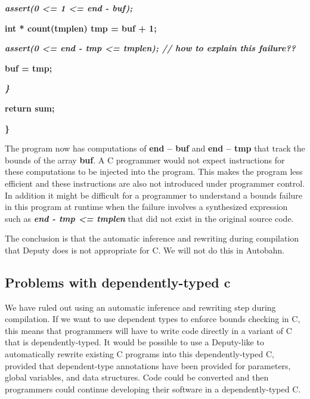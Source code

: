 \documentclass[]{article}
\begin{document}
\emph{\textbf{assert(0 \textless{}= 1 \textless{}= end - buf);}}

\textbf{int * count(tmplen) tmp = buf + 1;}

\emph{\textbf{assert(0 \textless{}= end - tmp \textless{}= tmplen); //
how to explain this failure??}}

\textbf{buf = tmp;}

\emph{\textbf{\}}}

\textbf{return sum;}

\textbf{\}}

The program now has computations of \textbf{end -- buf} and \textbf{end
-- tmp} that track the bounds of the array \textbf{buf}. A C programmer
would not expect instructions for these computations to be injected into
the program. This makes the program less efficient and these
instructions are also not introduced under programmer control. In
addition it might be difficult for a programmer to understand a bounds
failure in this program at runtime when the failure involves a
synthesized expression such as \emph{\textbf{end - tmp \textless{}=
tmplen}} that did not exist in the original source code.

The conclusion is that the automatic inference and rewriting during
compilation that Deputy does is not appropriate for C. We will not do
this in Autobahn.

\subsection{\texorpdfstring{\protect\hypertarget{ux5fToc420589169}{}{\protect\hypertarget{ux5fToc422906950}{}{\protect\hypertarget{ux5fToc424307673}{}{\protect\hypertarget{ux5fToc426641129}{}{\protect\hypertarget{ux5fToc435435004}{}{\protect\hypertarget{ux5fToc437460837}{}{\protect\hypertarget{ux5fToc440445518}{}{\protect\hypertarget{ux5fToc440449300}{}{\protect\hypertarget{ux5fToc440551950}{}{}}}}}}}}}Problems
with dependently-typed
c}{Problems with dependently-typed c}}\label{problems-with-dependently-typed-c}

We have ruled out using an automatic inference and rewriting step during
compilation. If we want to use dependent types to enforce bounds
checking in C, this means that programmers will have to write code
directly in a variant of C that is dependently-typed. It would be
possible to use a Deputy-like to automatically rewrite existing C
programs into this dependently-typed C, provided that dependent-type
annotations have been provided for parameters, global variables, and
data structures. Code could be converted and then programmers could
continue developing their software in a dependently-typed C.
\end{document}
